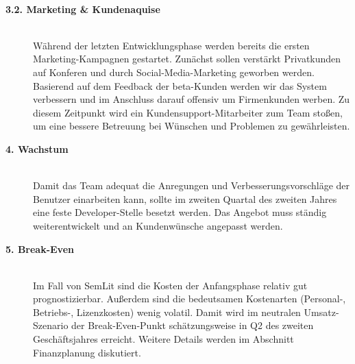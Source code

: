 \begin{description}
\\
  \item[\textbf{3.2. Marketing \& Kundenaquise}] \hfill \\
Während der letzten Entwicklungsphase werden bereits die ersten Marketing-Kampagnen gestartet. Zunächst sollen verstärkt Privatkunden auf Konferen und durch Social-Media-Marketing geworben werden. 
\\
Basierend auf dem Feedback der beta-Kunden werden wir das System verbessern und im Anschluss darauf offensiv um Firmenkunden werben. Zu diesem Zeitpunkt wird ein Kundensupport-Mitarbeiter zum Team stoßen, um eine bessere Betreuung bei Wünschen und Problemen zu gewährleisten.
\\
  \item[\textbf{4. Wachstum}] \hfill \\
Damit das Team adequat die Anregungen und Verbesserungsvorschläge der Benutzer einarbeiten kann, sollte im zweiten Quartal des zweiten Jahres eine feste Developer-Stelle besetzt werden. Das Angebot muss ständig weiterentwickelt und an Kundenwünsche angepasst werden.
\\
  \item[\textbf{5. Break-Even}] \hfill \\
Im Fall von SemLit sind die Kosten der Anfangsphase relativ gut prognostizierbar. Außerdem sind die bedeutsamen Kostenarten (Personal-, Betriebs-, Lizenzkosten) wenig volatil. Damit wird im neutralen Umsatz-Szenario der Break-Even-Punkt schätzungsweise in Q2 des zweiten Geschäftsjahres erreicht. Weitere Details werden im Abschnitt Finanzplanung diskutiert. 
\end{description}







